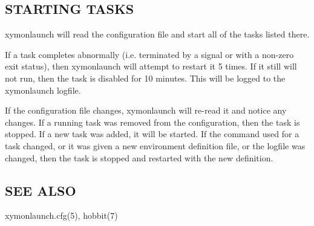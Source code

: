 \subsection{STARTING TASKS}  xymonlaunch will read the configuration
 file and start all of the tasks listed there. 


  If a task completes abnormally (i.e. terminated by a signal or with
  a non-zero exit status), then xymonlaunch will attempt to restart
  it 5 times. If it still will not run, then the task is disabled for
  10 minutes. This will be logged to the xymonlaunch logfile. 


  If the configuration file changes, xymonlaunch will re-read it and
  notice any changes. If a running task was removed from the
  configuration, then the task is stopped. If a new task was added, it
  will be started. If the command used for a task changed, or it was
  given a new environment definition file, or the logfile was changed,
  then the task is stopped and restarted with the new definition. 



 
\subsection{SEE ALSO}
xymonlaunch.cfg(5), hobbit(7) 
